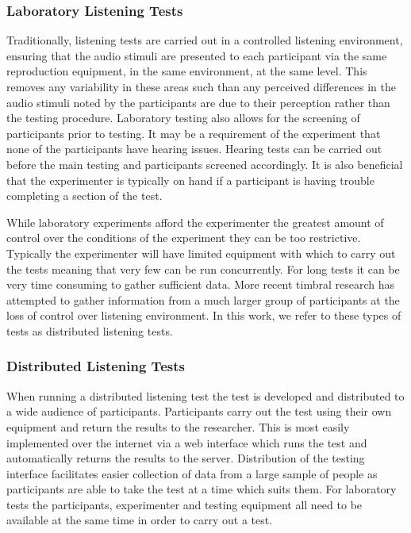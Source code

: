 		\subsubsection*{Laboratory Listening Tests}
			Traditionally, listening tests are carried out in a controlled listening environment, ensuring that
			the audio stimuli are presented to each participant via the same reproduction equipment, in the
			same environment, at the same level. This removes any variability in these areas such than any
			perceived differences in the audio stimuli noted by the participants are due to their perception
			rather than the testing procedure. Laboratory testing also allows for the screening of participants
			prior to testing. It may be a requirement of the experiment that none of the participants have
			hearing issues. Hearing tests can be carried out before the main testing and participants screened
			accordingly. It is also beneficial that the experimenter is typically on hand if a participant is
			having trouble completing a section of the test.

			While laboratory experiments afford the experimenter the greatest amount of control over the
			conditions of the experiment they can be too restrictive. Typically the experimenter will have
			limited equipment with which to carry out the tests meaning that very few can be run concurrently.
			For long tests it can be very time consuming to gather sufficient data. More recent timbral
			research has attempted to gather information from a much larger group of participants at the loss
			of control over listening environment. In this work, we refer to these types of tests as
			distributed listening tests.

		\subsubsection*{Distributed Listening Tests}
			When running a distributed listening test the test is developed and distributed to a wide audience
			of participants. Participants carry out the test using their own equipment and return the results
			to the researcher. This is most easily implemented over the internet via a web interface which runs
			the test and automatically returns the results to the server. Distribution of the testing interface
			facilitates easier collection of data from a large sample of people as participants are able to
			take the test at a time which suits them. For laboratory tests the participants, experimenter and
			testing equipment all need to be available at the same time in order to carry out a test.

